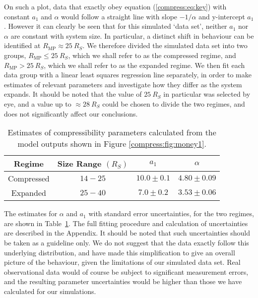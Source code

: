On such a plot, data that exactly obey equation (\ref{compress:eq:key}) with constant $a_1$ and $\alpha$ would follow a straight line with slope $-1/\alpha$ and y-intercept $a_1$. However it can clearly be seen that for this simulated `data set', neither $a_1$ nor $\alpha$ are constant with system size.
In particular, a distinct shift in behaviour can be identified at $R_\mathrm{MP} \approx \SI{25}{R_S}$. We therefore divided the simulated data set into two groups, $R_\mathrm{MP} \leq \SI{25}{R_S}$, which we shall refer to as the compressed regime, and $R_\mathrm{MP} > \SI{25}{R_S}$, which we shall refer to as the expanded regime. We then fit each data group with a linear least squares regression line separately, in order to make estimates of relevant parameters and investigate how they differ as the system expands. It should be noted that the value of $\SI{25}{R_S}$ in particular was selected by eye, and a value up to $\approx \SI{28}{R_S}$ could be chosen to divide the two regimes, and does not significantly affect our conclusions.

\begin{table}
\caption[Estimates of compressibility parameters for this study.]{Estimates of compressibility parameters calculated from the model outputs shown in Figure \ref{compress:fig:money1}.}\label{compress:table:money1}
\centering
\begin{tabular}{c c c c}
\hline
Regime & Size Range $(\si{R_S})$ & $a_1$ & $\alpha$   \\
\hline
Compressed & $14 - 25 $ & $10.0 \pm 0.1  $ & $4.80 \pm 0.09$ \\
Expanded & $25 - 40 $ & $7.0 \pm 0.2$ & $3.53 \pm 0.06$ \\
\hline
\end{tabular}
\end{table}
The estimates for $\alpha$ and $a_1$ with standard error uncertainties, for the two regimes, are shown in Table~\ref{compress:table:money1}. The full fitting procedure and calculation of uncertainties are described in the Appendix. It should be noted that such uncertainties should be taken as a guideline only. We do not suggest that the data exactly follow this underlying distribution, and have made this simplification to give an overall picture of the behaviour, given the limitations of our simulated data set. Real observational data would of course be subject to significant measurement errors, and the resulting parameter uncertainties would be higher than those we have calculated for our simulations.

